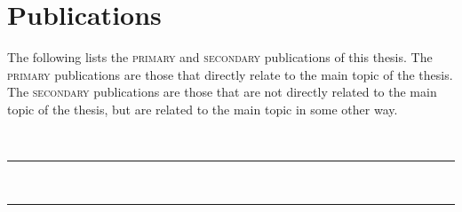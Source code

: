 \chapter[publications]{Publications}

The following lists the \textsc{primary} and \textsc{secondary} publications of this thesis. 
The \textsc{primary} publications are those that directly relate to the main topic of the thesis.
The \textsc{secondary} publications are those that are not directly related to the main topic of the thesis, but are related to the main topic in some other way.

\vspace{5mm}

\raggedright\par\noindent\hspace{8mm}{\large\scshape Primary}\\[-2mm]

\raggedleft\rule{\textwidth - 8mm}{0.4pt}

\begin{enumerate}[leftmargin=8mm,topsep=0mm,label={[\Alph*]}]

    \item {}

    \item {} 

\end{enumerate}

\vspace{5mm}

\raggedright\par\noindent\hspace{8mm}{\large\scshape Secondary}\\[-2mm]

\raggedleft\rule{\textwidth - 8mm}{0.4pt}

